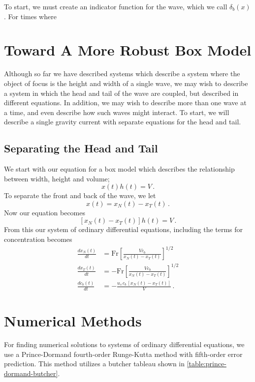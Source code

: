 	To start, we must create an indicator function for the wave, which we call \(\delta_b(x)\). For times where

	\chapter{Toward A More Robust Box Model}
	
	Although so far we have described systems which describe a system where the object of focus is the height and width of a single wave, we may wish to describe a system in which the head and tail of the wave are coupled, but described in different equations. In addition, we may wish to describe more than one wave at a time, and even describe how such waves might interact. To start, we will describe a single gravity current with separate equations for the head and tail.
	
	\section{Separating the Head and Tail}

	We start with our equation for a box model which describes the relationship between width, height and volume;
	\begin{equation}
		x(t)h(t) = V \,.
	\end{equation}
	To separate the front and back of the wave, we let
	\begin{equation*}
		x(t) = x_N(t) - x_T(t) \,.
	\end{equation*}
	Now our equation becomes
	\begin{equation*}
		\left[x_N(t) - x_T(t)\right]h(t) = V \,.
	\end{equation*}
	From this our system of ordinary differential equations, including the terms for concentration becomes
	\begin{align*}
		\frac{dx_N(t)}{dt} & = \text{Fr}\left[\frac{Vc_b}{x_N(t) - x_T(t)}\right]^{1/2}\\
		\frac{dx_T(t)}{dt} & = -\text{Fr}\left[\frac{Vc_b}{x_N(t) - x_T(t)}\right]^{1/2}\\
		\frac{dc_b(t)}{dt} & = -\frac{u_s \, c_b \, \left[x_N(t) - x_T(t)\right]}{V}\,.
	\end{align*}

	\chapter{Numerical Methods}

	For finding numerical solutions to systems of ordinary differential equations, we use a Prince-Dormand fourth-order Runge-Kutta method with fifth-order error prediction. This method utilizes a butcher tableau shown in \ref{table:prince-dormand-butcher}.
	
